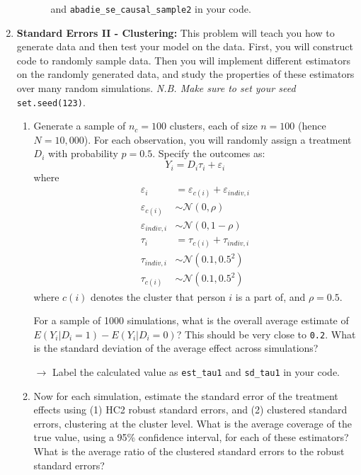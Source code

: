 \documentclass[11pt, a4paper]{article}
\begin{document}
\begin{enumerate}
\begin{enumerate}
\begin{enumerate}
  and  \texttt{abadie\_se\_causal\_sample2} in your code. 
  \end{enumerate}
\end{enumerate}
\item \textbf{Standard Errors II - Clustering:} This problem will teach you how to generate data and then test your model on the data. First, you will construct code to randomly sample data. Then you will implement different estimators on the randomly generated data, and study the properties of these estimators over many random simulations. \textit{N.B. Make sure to set your seed} \texttt{set.seed(123)}.
\begin{enumerate}
  \item Generate a sample of $n_{c}=100$ clusters, each of size $n=100$ (hence $N=10,000$). For each observation, you will randomly assign a treatment $D_{i}$ with probability $p=0.5$. Specify the outcomes as:
  \begin{equation}
    Y_{i} = D_{i}\tau_{i} + \varepsilon_{i}
  \end{equation}
  where 
  \begin{align}
    \varepsilon_{i} &= \varepsilon_{c(i)} + \varepsilon_{indiv,i}\\
    \varepsilon_{c(i)} &\sim \mathcal{N}(0, \rho)\\
    \varepsilon_{indiv,i} &\sim \mathcal{N}(0, 1-\rho)\\
    \tau_{i} &= \tau_{c(i)} + \tau_{indiv,i}\\
    \tau_{indiv, i} &\sim \mathcal{N}(0.1, 0.5^{2})\\
    \tau_{c(i)} &\sim \mathcal{N}(0.1, 0.5^{2})
  \end{align}
  where $c(i)$ denotes the cluster that person $i$ is a part of, and $\rho = 0.5$.

  For a sample of 1000 simulations, what is the overall average estimate of $E(Y_{i} | D_{i} = 1) - E(Y_{i} | D_{i} = 0)$? This should be very close to \texttt{0.2}. What is the standard deviation of the average effect across simulations?

  \hspace{10pt} $\rightarrow$ Label the calculated value as \texttt{est\_tau1} and \texttt{sd\_tau1} in your code.
  \item Now for each simulation, estimate the standard error of the treatment effects using (1) HC2 robust standard errors, and (2)  clustered standard errors, clustering at the cluster level. What is the average coverage of the true value, using a 95\% confidence interval, for each of these estimators? What is the average ratio of the clustered standard errors to the robust standard errors?


\end{enumerate}
\end{enumerate}
\end{document}
